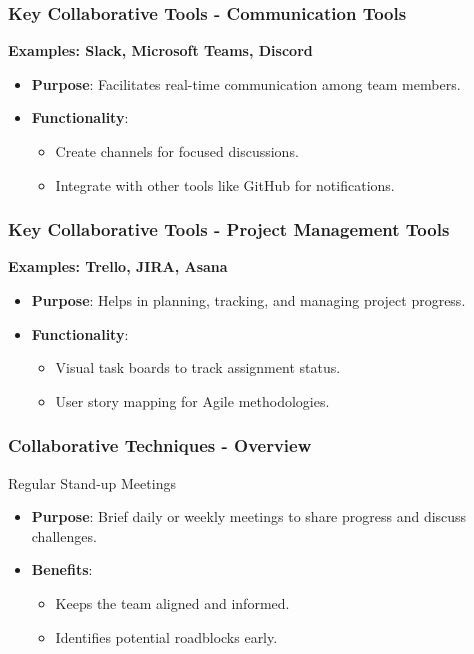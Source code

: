 \documentclass{beamer}
\begin{document}
\begin{frame}[fragile]
    \frametitle{Key Collaborative Tools - Communication Tools}
    \textbf{Examples: Slack, Microsoft Teams, Discord}
    \begin{itemize}
        \item \textbf{Purpose}: Facilitates real-time communication among team members.
        \item \textbf{Functionality}:
        \begin{itemize}
            \item Create channels for focused discussions.
            \item Integrate with other tools like GitHub for notifications.
        \end{itemize}
    \end{itemize}
\end{frame}

\begin{frame}[fragile]
    \frametitle{Key Collaborative Tools - Project Management Tools}
    \textbf{Examples: Trello, JIRA, Asana}
    \begin{itemize}
        \item \textbf{Purpose}: Helps in planning, tracking, and managing project progress.
        \item \textbf{Functionality}:
        \begin{itemize}
            \item Visual task boards to track assignment status.
            \item User story mapping for Agile methodologies.
        \end{itemize}
    \end{itemize}
\end{frame}

\begin{frame}[fragile]
    \frametitle{Collaborative Techniques - Overview}
    \begin{block}{Regular Stand-up Meetings}
        \begin{itemize}
            \item \textbf{Purpose}: Brief daily or weekly meetings to share progress and discuss challenges.
            \item \textbf{Benefits}:
            \begin{itemize}
                \item Keeps the team aligned and informed.
                \item Identifies potential roadblocks early.
            \end{itemize}
        \end{itemize}
    \end{block}
\end{frame}
\end{document}
